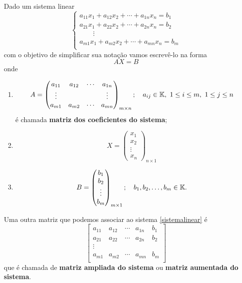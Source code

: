 Dado um sistema linear
\begin{equation}
	\begin{cases}
		a_{11}x_1 + a_{12}x_2 + \cdots + a_{1n}x_n = b_1\\
		a_{21}x_1 + a_{22}x_2 + \cdots + a_{2n}x_n = b_2\\
		\qquad \vdots\\
		a_{m1}x_1 + a_{m2}x_2 + \cdots + a_{mn}x_n = b_m\\
	\end{cases}
\end{equation}
com o objetivo de simplificar sua nota\c{c}\~ao vamos escrev\^e-lo na forma
\begin{equation}\label{formamatricial}
	AX = B
\end{equation}
onde
\begin{enumerate}
	\item
	\[
		A = \begin{pmatrix}
				a_{11} & a_{12} & \cdots & a_{1n}\\
				\vdots & & & \vdots\\
				a_{m1} & a_{m2} & \cdots & a_{mn}
		    \end{pmatrix}_{m\times n}; \quad a_{ij} \in \mathbb{K},\ 1 \le i \le m,\ 1 \le j \le n
	\]
	\'e chamada \textbf{matriz dos coeficientes do sistema};
	\item
	\[
		X = \begin{pmatrix}
			x_1\\
			x_2\\
			\vdots\\
			x_n
		\end{pmatrix}_{n \times 1}
	\]
	\item
	\[
		B = \begin{pmatrix}
			b_1\\
			b_2\\
			\vdots\\
			b_m
		\end{pmatrix}_{m \times 1}; \quad b_1, b_2, \dots, b_m \in \mathbb{K}.
	\]
\end{enumerate}

Uma outra matriz que podemos associar ao sistema \eqref{sistemalinear} \'e
\[
	\begin{bmatrix}
		a_{11} & a_{12} & \cdots & a_{1n} & b_1\\
		a_{21} & a_{22} & \cdots & a_{2n} & b_2\\
		\vdots\\
		a_{m1} & a_{m2} & \cdots & a_{mn} & b_m\\
	\end{bmatrix}
\]
que \'e chamada de \textbf{matriz ampliada do sistema} ou \textbf{matriz aumentada do sistema}.

